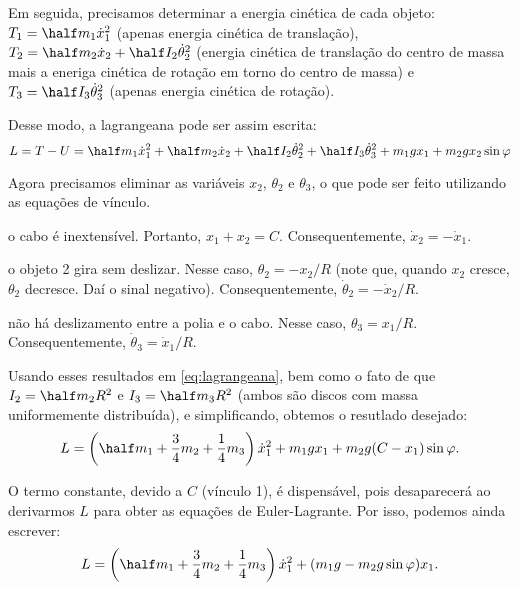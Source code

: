 \begin{question}
\begin{solution}
\begin{enumerate}
			Em seguida, precisamos determinar a energia cinética de cada objeto: $T_1 = \half m_1 \dot x_1^2$ (apenas energia cinética de translação), $T_2 = \half m_2 \dot x_2 + \half I_2 \dot\theta_2^2$ (energia cinética de translação do centro de massa mais a eneriga cinética de rotação em torno do centro de massa) e $T_3 = \half I_3 \dot\theta_3^2$ (apenas energia cinética de rotação).

			Desse modo, a lagrangeana pode ser assim escrita:
			\begin{equation}\label{eq:lagrangeana}
				L = T - U = \half m_1 \dot x_1^2 + \half m_2 \dot x_2 + \half I_2 \dot\theta_2^2 + \half I_3 \dot\theta_3^2 + m_1gx_1 + m_2gx_2\sin\varphi
			\end{equation}

			Agora precisamos eliminar as variáveis $x_2$, $\theta_2$ e $\theta_3$, o que pode ser feito utilizando as equações de vínculo.

			Usando esses resultados em \eqref{eq:lagrangeana}, bem como o fato de que $I_2 = \half m_2 R^2$ e $I_3 = \half m_3 R^2$ (ambos são discos com massa uniformemente distribuída), e simplificando, obtemos o resutlado desejado:
			\begin{equation*}
				L = \left(\half m_1 + \frac{3}{4}m_2 + \frac{1}{4}m_3\right)\dot x_1^2 + m_1 g x_1 + m_2 g (C - x_1) \sin\varphi.
			\end{equation*}

			O termo constante, devido a $C$ (vínculo 1), é dispensável, pois desaparecerá ao derivarmos $L$ para obter as equações de Euler-Lagrante.
			Por isso, podemos ainda escrever:
			\begin{equation*}
				L = \left(\half m_1 + \frac{3}{4}m_2 + \frac{1}{4}m_3\right)\dot x_1^2 + (m_1 g - m_2 g \sin\varphi)x_1.
			\end{equation*}


\end{enumerate}
\end{solution}
\end{question}
